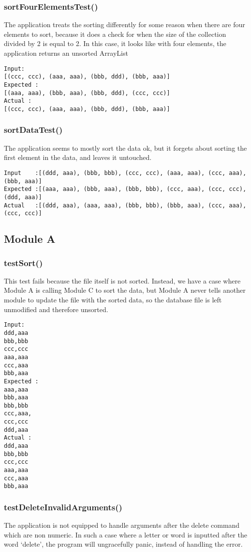 \subsubsection{sortFourElementsTest()}
The application treats the sorting differently for some reason when there are
four elements to sort, because it does a check for when the size of the
collection divided by 2 is equal to 2. In this case, it looks like with four
elements, the application returns an unsorted ArrayList

\begin{verbatim}
Input:
[(ccc, ccc), (aaa, aaa), (bbb, ddd), (bbb, aaa)]
Expected :
[(aaa, aaa), (bbb, aaa), (bbb, ddd), (ccc, ccc)]
Actual :
[(ccc, ccc), (aaa, aaa), (bbb, ddd), (bbb, aaa)]
\end{verbatim}

\subsubsection{sortDataTest()}
The application seems to mostly sort the data ok, but it forgets about sorting
the first element in the data, and leaves it untouched.

\begin{verbatim}
Input    :[(ddd, aaa), (bbb, bbb), (ccc, ccc), (aaa, aaa), (ccc, aaa), (bbb, aaa)]   
Expected :[(aaa, aaa), (bbb, aaa), (bbb, bbb), (ccc, aaa), (ccc, ccc), (ddd, aaa)]
Actual   :[(ddd, aaa), (aaa, aaa), (bbb, bbb), (bbb, aaa), (ccc, aaa), (ccc, ccc)]
\end{verbatim}

\subsection{Module A}
\subsubsection{testSort()}
This test fails because the file itself is not sorted. Instead, we have a case
where Module A is calling Module C to sort the data, but Module A never tells
another module to update the file with the sorted data, so the database file is
left unmodified and therefore unsorted.

\begin{verbatim}
Input:
ddd,aaa
bbb,bbb
ccc,ccc
aaa,aaa
ccc,aaa
bbb,aaa
Expected :
aaa,aaa
bbb,aaa
bbb,bbb
ccc,aaa,
ccc,ccc
ddd,aaa
Actual :
ddd,aaa
bbb,bbb
ccc,ccc
aaa,aaa
ccc,aaa
bbb,aaa
\end{verbatim}

\subsubsection{testDeleteInvalidArguments()}
The application is not equipped to handle arguments after the delete command
which are non numeric. In such a case where a letter or word is inputted after
the word `delete', the program will ungracefully panic, instead of handling the
error.

